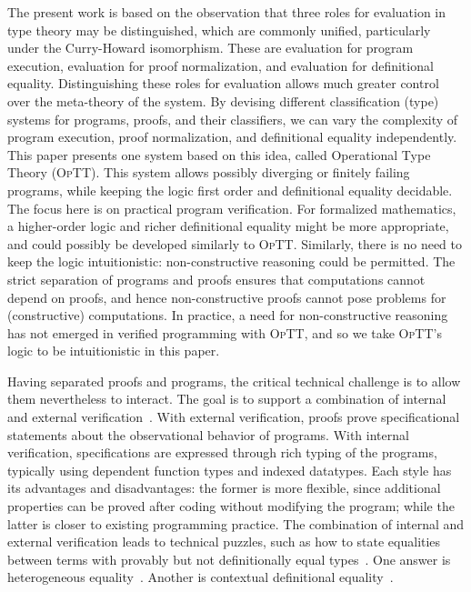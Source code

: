 \documentclass{fundam}
\newcommand{\optt}{\textsc{OpTT}}
\begin{document}
The present work is based on the observation that three roles for
evaluation in type theory may be distinguished, which are commonly
unified, particularly under the Curry-Howard isomorphism.  These are
evaluation for program execution, evaluation for proof normalization,
and evaluation for definitional equality.  Distinguishing these roles
for evaluation allows much greater control over the meta-theory of the
system.  By devising different classification (type) systems for
programs, proofs, and their classifiers, we can vary the complexity of
program execution, proof normalization, and definitional equality
independently.  This paper presents one system based on this idea,
called Operational Type Theory (\optt).  This system allows possibly
diverging or finitely failing programs, while keeping the logic first
order and definitional equality decidable.  The focus here is on
practical program verification.  For formalized mathematics, a
higher-order logic and richer definitional equality might be more
appropriate, and could possibly be developed similarly to \optt.
Similarly, there is no need to keep the logic intuitionistic:
non-constructive reasoning could be permitted.  The strict separation
of programs and proofs ensures that computations cannot depend on
proofs, and hence non-constructive proofs cannot pose problems for
(constructive) computations.  In practice, a need for non-constructive
reasoning has not emerged in verified programming with \optt, and so
we take \optt's logic to be intuitionistic in this paper.

Having separated proofs and programs, the critical technical challenge
is to allow them nevertheless to interact.  The goal is to support a
combination of internal and external
verification~\cite{alti:esslli96}.  With external verification, proofs
prove specificational statements about the observational behavior of
programs.  With internal verification, specifications are expressed
through rich typing of the programs, typically using dependent
function types and indexed datatypes.  Each style has its advantages
and disadvantages: the former is more flexible, since additional
properties can be proved after coding without modifying the program;
while the latter is closer to existing programming practice.  The
combination of internal and external verification leads to technical
puzzles, such as how to state equalities between terms with provably
but not definitionally equal types~\cite{hofmann+98}.  One answer is
heterogeneous equality~\cite{mcbride99}.  Another is contextual
definitional equality~\cite{blanqui+08}.
\end{document}
